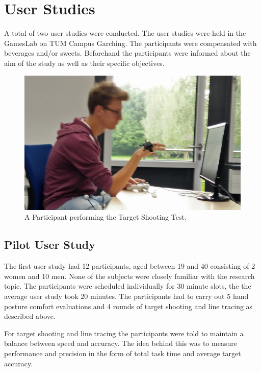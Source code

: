 \chapter{User Studies}\label{chapter:userstudy}

A total of two user studies were conducted. The user studies were held in the GamesLab on TUM Campus Garching. The participants were compensated with beverages and/or sweets. Beforehand the participants were informed about the aim of the study as well as their specific objectives. 

\begin{figure}[h]
\centering
\includegraphics[width=\textwidth]{baschde}
\caption{A Participant performing the Target Shooting Test.}
\label{fig:baschde}
\end{figure}

\section{Pilot User Study}

The first user study had 12 participants, aged between 19 and 40 consisting of 2 women and 10 men. None of the subjects were closely familiar with the research topic. The participants were scheduled individually for 30 minute slots, the the average user study took 20 minutes.
The participants had to carry out 5 hand posture comfort evaluations and 4 rounds of target shooting and line tracing as described above. 

For target shooting and line tracing the participants were told to maintain a balance between speed and accuracy. The idea behind this was to measure performance and precision in the form of total task time and average target accuracy. 

